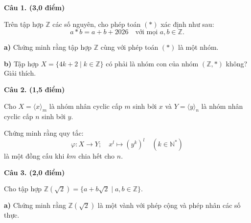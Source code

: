 \vspace{1cm}


\noindent\textbf{\large Câu 1. (3,0 điểm)}

\vspace{0.3cm}

Trên tập hợp $\mathbb{Z}$ các số nguyên, cho phép toán $(*)$ xác định như sau:
\[
    a * b = a + b + 2026 \quad \text{với mọi } a, b \in \mathbb{Z}.
\]

\textbf{a)} Chứng minh rằng tập hợp $\mathbb{Z}$ cùng với phép toán $(*)$ là một nhóm.

\vspace{0.3cm}

\textbf{b)} Tập hợp $X = \{4k + 2 \mid k \in \mathbb{Z}\}$ có phải là nhóm con của nhóm $(\mathbb{Z}, *)$ không? Giải thích.

\vspace{0.6cm}
\noindent\textbf{\large Câu 2. (1,5 điểm)}

\vspace{0.3cm}

Cho $X = \langle x \rangle_m$ là nhóm nhân cyclic cấp $m$ sinh bởi $x$ và $Y = \langle y \rangle_n$ là nhóm nhân cyclic cấp $n$ sinh bởi $y$. 

Chứng minh rằng quy tắc:
\[
    \varphi: X \to Y; \quad x^l \mapsto (y^k)^l \quad (k \in \mathbb{N}^*)
\]
là một đồng cấu khi $km$ chia hết cho $n$.

\vspace{0.6cm}
\noindent\textbf{\large Câu 3. (2,0 điểm)}

\vspace{0.3cm}

Cho tập hợp $\mathbb{Z}(\sqrt{2}) = \{a + b\sqrt{2} \mid a, b \in \mathbb{Z}\}$.

\vspace{0.3cm}

\textbf{a)} Chứng minh rằng $\mathbb{Z}(\sqrt{2})$ là một vành với phép cộng và phép nhân các số thực.

